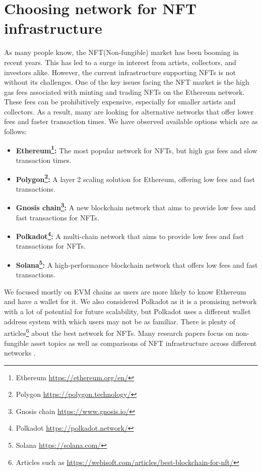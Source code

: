 \chapter{Choosing network for NFT infrastructure}
As many people know, the NFT(Non-fungible) market has been booming in recent years. This has led to a surge in interest from artists, collectors, and investors alike. However, the current infrastructure supporting NFTs is not without its challenges. One of the key issues facing the NFT market is the high gas fees associated with minting and trading NFTs on the Ethereum network. These fees can be prohibitively expensive, especially for smaller artists and collectors. As a result, many are looking for alternative networks that offer lower fees and faster transaction times.
We have observed available options which are as follows:
\begin{itemize}
    \item \textbf{Ethereum\footnote{Ethereum \url{https://ethereum.org/en/}}:} The most popular network for NFTs, but high gas fees and slow transaction times.
    \item \textbf{Polygon\footnote{Polygon \url{https://polygon.technology/}}:} A layer 2 scaling solution for Ethereum, offering low fees and fast transactions.
    \item \textbf{Gnosis chain\footnote{Gnosis chain \url{https://www.gnosis.io/}}:} A new blockchain network that aims to provide low fees and fast transactions for NFTs.
    \item \textbf{Polkadot\footnote{Polkadot \url{https://polkadot.network/}}:} A multi-chain network that aims to provide low fees and fast transactions for NFTs.
    \item \textbf{Solana\footnote{Solana \url{https://solana.com/}}:} A high-performance blockchain network that offers low fees and fast transactions.
\end{itemize}

We focused mostly on EVM chains as users are more likely to know Ethereum and have a wallet for it. We also considered Polkadot as it is a promising network with a lot of potential for future scalability, but Polkadot uses a different wallet address system with which users may not be as familiar. There is plenty of articles\footnote{Articles such as \url{https://webisoft.com/articles/best-blockchain-for-nft/}} about the best network for NFTs. Many research papers focus on non-fungible asset topics as well as comparisons of NFT infrastructure across different networks \cite{fintech1030017}.


